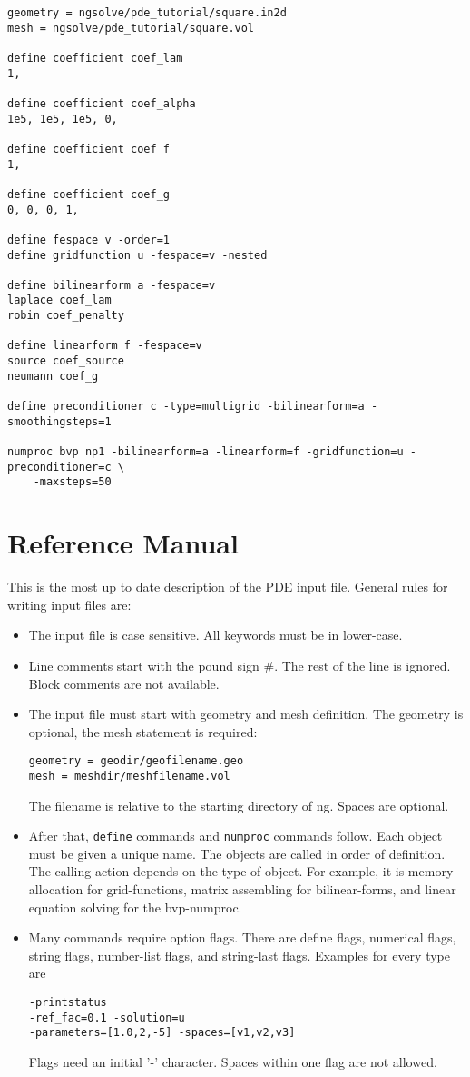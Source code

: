 \documentclass[12pt]{book}
\begin{document}
\begin{verbatim}
geometry = ngsolve/pde_tutorial/square.in2d
mesh = ngsolve/pde_tutorial/square.vol

define coefficient coef_lam
1, 

define coefficient coef_alpha
1e5, 1e5, 1e5, 0, 

define coefficient coef_f
1,

define coefficient coef_g
0, 0, 0, 1,

define fespace v -order=1
define gridfunction u -fespace=v -nested

define bilinearform a -fespace=v
laplace coef_lam
robin coef_penalty

define linearform f -fespace=v
source coef_source
neumann coef_g

define preconditioner c -type=multigrid -bilinearform=a -smoothingsteps=1

numproc bvp np1 -bilinearform=a -linearform=f -gridfunction=u -preconditioner=c \
    -maxsteps=50
\end{verbatim}



\chapter{Reference Manual}

This is the most up to date description of the PDE input file. 
General rules for writing input files are:
\begin{itemize}
\item
The input file is case sensitive. All keywords must be in lower-case.
\item
Line comments start with the pound sign \#. The rest of the line is ignored.
Block comments are not available.
\item
The input file must start with geometry and mesh definition. The geometry is optional,
the mesh statement is required:
\begin{verbatim}
geometry = geodir/geofilename.geo
mesh = meshdir/meshfilename.vol
\end{verbatim}
The filename is relative to the starting directory of ng. Spaces are optional.
\item
After that, {\tt define} commands and {\tt numproc} commands
follow. Each object must be given a unique name.  The objects are
called in order of definition. The calling action depends on the type
of object. For example, it is memory allocation for grid-functions,
matrix assembling for bilinear-forms, and linear equation solving for
the bvp-numproc.
\item
Many commands require option flags. There are define flags, numerical flags, 
string flags, number-list flags, and string-last flags. Examples for every type are
\begin{verbatim}
-printstatus 
-ref_fac=0.1 -solution=u 
-parameters=[1.0,2,-5] -spaces=[v1,v2,v3]
\end{verbatim}
Flags need an initial '-' character. Spaces within one flag are not allowed.
\end{itemize}
\end{document}
